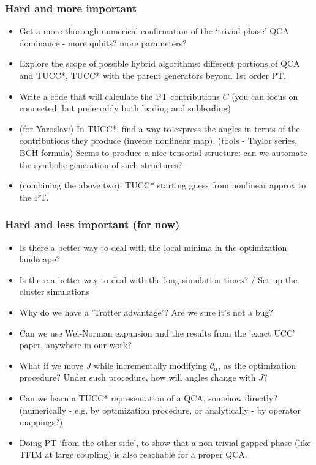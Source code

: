 \documentclass[10pt, a4paper]{article}
\begin{document}
\subsubsection*{Hard and more important}
\begin{itemize}
\item Get a more thorough numerical confirmation of the `trivial phase' QCA dominance - more qubits? more parameters?
\item Explore the scope of possible hybrid algorithms: different portions of QCA and TUCC*, TUCC* with the parent generators beyond 1st order PT.
\item Write a code that will calculate the PT contributions $C$ (you can focus on connected, but preferrably both leading and subleading)
\item (for Yaroslav:) In TUCC*, find a way to express the angles in terms of the contributions they produce (inverse nonlinear map). (tools - Taylor series, BCH formula) Seems to produce a nice tensorial structure: can we automate the symbolic generation of such structures?
\item (combining the above two): TUCC* starting guess from nonlinear approx to the PT.
\end{itemize}

\subsubsection*{Hard and less important (for now)}
\begin{itemize}

\item Is there a better way to deal with the local minima in the optimization landscape?
\item Is there a better way to deal with the long simulation times? / Set up the cluster simulations
\item Why do we have a 'Trotter advantage'? Are we sure it's not a bug?
\item Can we use Wei-Norman expansion and the results from the 'exact UCC' paper, anywhere in our work?
\item What if we move $J$ while incrementally modifying $\theta_{\alpha}$, as the optimization procedure? Under such procedure, how will angles change with $J$?
\item Can we learn a TUCC* representation of a QCA, somehow directly? (numerically - e.g. by optimization procedure, or analytically - by operator mappings?)

\item Doing PT `from the other side', to show that a non-trivial gapped phase (like TFIM at large coupling) is also reachable for a proper QCA.

\end{itemize}
\end{document}
